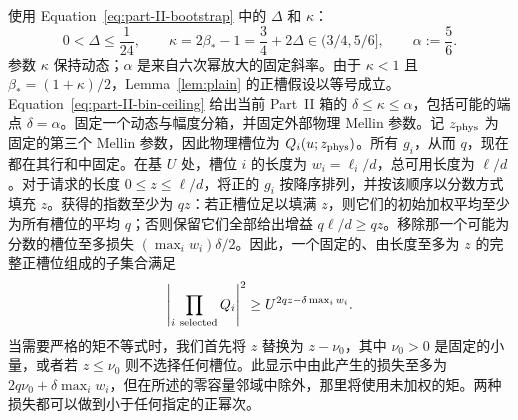 \documentclass[11pt,a4paper]{article}
\numberwithin{equation}{section}
\numberwithin{figure}{section}
\theoremstyle{definition}
\theoremstyle{remark}
\begin{document}
使用 Equation~\eqref{eq:part-II-bootstrap} 中的 \(\Delta\) 和 \(\kappa\)：
\[
 0<\Delta\le\frac1{24},\qquad
 \kappa=2\beta_*-1=\frac34+2\Delta\in(3/4,5/6],\qquad
 \alpha:=\frac56.
\]
参数 \(\kappa\) 保持动态；\(\alpha\) 是来自六次幂放大的固定斜率。由于 \(\kappa<1\) 且 \(\beta_*=(1+\kappa)/2\)，Lemma~\ref{lem:plain} 的正槽假设以等号成立。Equation~\eqref{eq:part-II-bin-ceiling} 给出当前 Part~II 箱的 \(\delta\le\kappa\le\alpha\)，包括可能的端点 \(\delta=\alpha\)。固定一个动态与幅度分箱，并固定外部物理 Mellin 参数。记 \(z_{\rm phys}\) 为固定的第三个 Mellin 参数，因此物理槽位为 \(Q_i(u;z_{\rm phys})\)。所有 \(g_i\)，从而 \(q\)，现在都在其行和中固定。在基 \(U\) 处，槽位 \(i\) 的长度为 \(w_i=\ell_i/d\)，总可用长度为 \(\ell/d\)。对于请求的长度 \(0\le z\le\ell/d\)，将正的 \(g_i\) 按降序排列，并按该顺序以分数方式填充 \(z\)。获得的指数至少为 \(qz\)：若正槽位足以填满 \(z\)，则它们的初始加权平均至少为所有槽位的平均 \(q\)；否则保留它们全部给出增益 \(q\ell/d\ge qz\)。移除那一个可能为分数的槽位至多损失 \((\max_i w_i)\delta/2\)。因此，一个固定的、由长度至多为 \(z\) 的完整正槽位组成的子集合满足
\[
 \left|\prod_{i\ {\rm selected}}Q_i\right|^2
 \ge U^{2qz-\delta\max_iw_i}.
\]
当需要严格的矩不等式时，我们首先将 \(z\) 替换为 \(z-\nu_0\)，其中 \(\nu_0>0\) 是固定的小量，或者若 \(z\le\nu_0\) 则不选择任何槽位。此显示中由此产生的损失至多为 \(2q\nu_0+\delta\max_iw_i\)，但在所述的零容量邻域中除外，那里将使用未加权的矩。两种损失都可以做到小于任何指定的正幂次。
\end{document}
